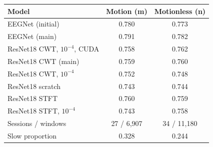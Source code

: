 \begin{tabular}{@{}lcc@{}}
\toprule
Model & Motion (m) & Motionless (n) \\
\midrule
EEGNet (initial) & 0.780 & 0.773 \\
EEGNet (main) & 0.791 & 0.782 \\
ResNet18 CWT, $10^{-4}$, CUDA & 0.758 & 0.762 \\
ResNet18 CWT (main) & 0.759 & 0.760 \\
ResNet18 CWT, $10^{-4}$ & 0.752 & 0.748 \\
ResNet18 scratch & 0.743 & 0.744 \\
ResNet18 STFT & 0.760 & 0.759 \\
ResNet18 STFT, $10^{-4}$ & 0.743 & 0.758 \\
\midrule
Sessions / windows & 27 / 6{,}907 & 34 / 11{,}180 \\
Slow proportion & 0.328 & 0.244 \\
\bottomrule
\end{tabular}
